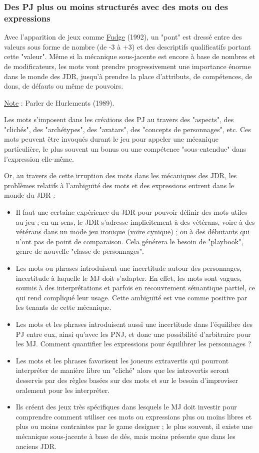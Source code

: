 \documentclass[a4paper, 11pt, twoside]{article}
\begin{document}
\subsubsection{Des PJ plus ou moins structurés avec des mots ou des expressions}
\label{sec:org968139b}

Avec l'apparition de jeux comme \href{https://github.com/orey/jdr/tree/master/Fudge-fr}{Fudge} (1992), un "pont" est dressé entre des valeurs sous forme de nombre (de -3 à +3) et des descriptifs qualificatifs portant cette "valeur". Même si la mécanique sous-jacente est encore à base de nombres et de modificateurs, les mots vont prendre progressivement une importance énorme dans le monde des JDR, jusqu'à prendre la place d'attributs, de compétences, de dons, de défauts ou même de pouvoirs.

\uline{Note} : Parler de Hurlements (1989).

Les mots s'imposent dans les créations des PJ au travers des "aspects", des "clichés", des "archétypes", des "avatars", des "concepts de personnages", etc. Ces mots peuvent être invoqués durant le jeu pour appeler une mécanique particulière, le plus souvent un bonus ou une compétence "sous-entendue" dans l'expression elle-même.

Or, au travers de cette irruption des mots dans les mécaniques des JDR, les problèmes relatifs à l'ambiguïté des mots et des expressions entrent dans le monde du JDR :

\begin{itemize}
\item Il faut une certaine expérience du JDR pour pouvoir définir des mots utiles au jeu ; en un sens, le JDR s'adresse implicitement à des vétérans, voire à des vétérans dans un mode jeu ironique (voire cynique) ; ou à des débutants qui n'ont pas de point de comparaison. Cela générera le besoin de "playbook", genre de nouvelle "classe de personnages".
\item Les mots ou phrases introduisent une incertitude autour des personnages, incertitude à laquelle le MJ doit s'adapter. En effet, les mots sont vagues, soumis à des interprétations et parfois en recouvrement sémantique partiel, ce qui rend compliqué leur usage. Cette ambiguïté est vue comme positive par les tenants de cette mécanique.
\item Les mots et les phrases introduisent aussi une incertitude dans l'équilibre des PJ entre eux, ainsi qu'avec les PNJ, et donc une possibilité d'arbitraire pour les MJ. Comment quantifier les expressions pour équilibrer les personnages ?
\item Les mots et les phrases favorisent les joueurs extravertis qui pourront interpréter de manière libre un "cliché" alors que les introvertis seront desservis par des règles basées sur des mots et sur le besoin d'improviser oralement pour les interpréter.
\item Ils créent des jeux très spécifiques dans lesquels le MJ doit investir pour comprendre comment utiliser ces mots ou expressions plus ou moins libres et plus ou moins contraintes par le game designer ; le plus souvent, il existe une mécanique sous-jacente à base de dés, mais moins présente que dans les anciens JDR.
\end{itemize}
\end{document}
